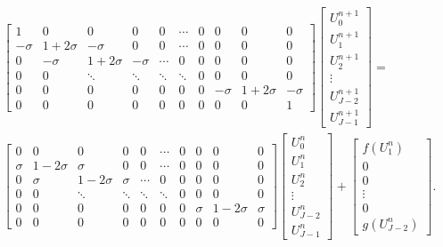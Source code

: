 \documentclass[../summary.tex]{subfiles}
\begin{document}
\begin{align*}
\begin{bmatrix}
1 & 0 & 0 & 0 & 0 & \cdots & 0 & 0 & 0 & 0\\
-\sigma & 1+2\sigma & -\sigma & 0 & 0 & \cdots & 0 & 0 & 0 & 0 \\
0 & -\sigma & 1+2\sigma & -\sigma & \cdots & 0 & 0 & 0 & 0 & 0 \\
0 & 0 & \ddots & \ddots & \ddots & \ddots & 0 & 0 & 0 & 0 \\
0 & 0 & 0 & 0 & 0 & 0 & 0 & -\sigma & 1+2\sigma & -\sigma \\
0 & 0 & 0 & 0 & 0 & 0 & 0 & 0 & 0 & 1
\end{bmatrix}
\begin{bmatrix}
U_0^{n+1} \\
U_1^{n+1} \\
U_2^{n+1} \\
\vdots \\
U_{J-2}^{n+1} \\
U_{J-1}^{n+1}
\end{bmatrix} 
= \\
\begin{bmatrix}
0 & 0 & 0 & 0 & 0 & \cdots & 0 & 0 & 0 & 0\\
\sigma & 1-2\sigma & \sigma & 0 & 0 & \cdots & 0 & 0 & 0 & 0 \\
0 & \sigma & 1-2\sigma & \sigma & \cdots & 0 & 0 & 0 & 0 & 0 \\
0 & 0 & \ddots & \ddots & \ddots & \ddots & 0 & 0 & 0 & 0 \\
0 & 0 & 0 & 0 & 0 & 0 & 0 & \sigma & 1-2\sigma & \sigma \\
0 & 0 & 0 & 0 & 0 & 0 & 0 & 0 & 0 & 0
\end{bmatrix}
\begin{bmatrix}
U_0^{n} \\
U_1^{n} \\
U_2^{n} \\
\vdots \\
U_{J-2}^{n} \\
U_{J-1}^{n}
\end{bmatrix} +
\begin{bmatrix}
f(U_1^n) \\
0 \\
0 \\
\vdots \\
0 \\
g(U_{J-2}^n)
\end{bmatrix}.
\end{align*}
\end{document}
